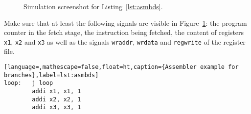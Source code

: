 \begin{figure}[ht!]
	\centering
	\dummyimage
	\caption{Simulation screenshot for Listing~\ref{lst:asmbds}.}
	\label{fig:sim2}
\end{figure}

Make sure that at least the following signals are visible in
Figure~\ref{fig:sim2}: the program counter in the fetch stage, the
instruction being fetched, the content of registers \texttt{x1}, 
\texttt{x2} and \texttt{x3} as well as the signals \texttt{wraddr},
\texttt{wrdata} and \texttt{regwrite} of the register file.

\begin{lstlisting}[language=,mathescape=false,float=ht,caption={Assembler example for branches},label=lst:asmbds]
loop:   j loop
        addi x1, x1, 1
        addi x2, x2, 1
        addi x3, x3, 1
\end{lstlisting}

